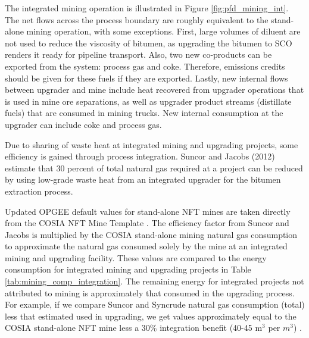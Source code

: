 \documentclass[11pt]{report}
\begin{document}
The integrated mining operation is illustrated in Figure \ref{fig:pfd_mining_int}.  The net flows across the process boundary are roughly equivalent to the stand-alone mining operation, with some exceptions. First, large volumes of diluent are not used to reduce the viscosity of bitumen, as upgrading the bitumen to SCO renders it ready for pipeline transport.  Also, two new co-products can be exported from the system: process gas and coke.  Therefore, emissions credits should be given for these fuels if they are exported.  Lastly, new internal flows between upgrader and mine include heat recovered from upgrader operations that is used in mine ore separations, as well as upgrader product streams (distillate fuels) that are consumed in mining trucks.  New internal consumption at the upgrader can include coke and process gas.

Due to sharing of waste heat at integrated mining and upgrading projects, some efficiency is gained through process integration.  Suncor and Jacobs (2012) estimate that 30 percent of total natural gas required at a project can be reduced by using low-grade waste heat from an integrated upgrader for the bitumen extraction process.

Updated OPGEE default values for stand-alone NFT mines are taken directly from the COSIA NFT Mine Template \cite{COSIA2015b}. The efficiency factor from Suncor and Jacobs \cite{Jacobs2012} is multiplied by the COSIA stand-alone mining natural gas consumption to approximate the natural gas consumed solely by the mine at an integrated mining and upgrading facility. These values are compared to the energy consumption for integrated mining and upgrading projects in Table \ref{tab:mining_comp_integration}. The remaining energy for integrated projects not attributed to mining is approximately that consumed in the upgrading process.  For example, if we compare Suncor and Syncrude natural gas consumption (total) less that estimated used in upgrading, we get values approximately equal to the COSIA stand-alone NFT mine less a 30\% integration benefit (40-45 m$^3$ per $m^3$) .  
\end{document}
